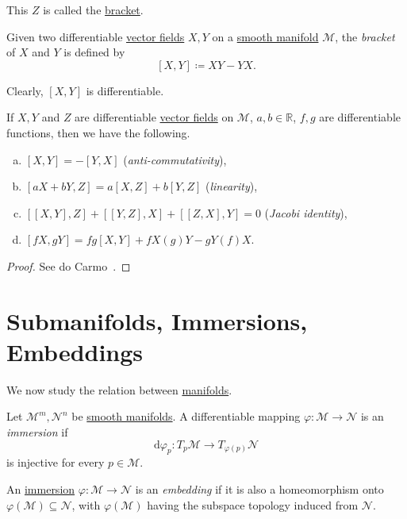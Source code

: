 This \(Z\) is called the \hyperref[def:bracket]{bracket}.

\begin{definition}[Bracket]\label{def:bracket}
	Given two differentiable \hyperref[def:vector-field]{vector fields} \(X, Y\) on a \hyperref[def:smooth-manifold]{smooth manifold} \(\mathcal{M} \), the \emph{bracket} of \(X\) and \(Y\) is defined by
	\[
		[X, Y] \coloneqq XY - YX.
	\]
\end{definition}

Clearly, \([X, Y]\) is differentiable.

\begin{proposition}
	If \(X, Y\) and \(Z\) are differentiable \hyperref[def:vector-field]{vector fields} on \(\mathcal{M} \), \(a, b\in \mathbb{R} \), \(f, g\) are differentiable functions, then we have the following.
	\begin{enumerate}[(a)]
		\item \([X, Y] = -[Y, X]\) (\emph{anti-commutativity}),
		\item \([aX + bY, Z] = a[X, Z] + b[Y, Z]\) (\emph{linearity}),
		\item \([[X, Y], Z] + [[Y, Z], X] + [[Z, X], Y] = 0\) (\emph{Jacobi identity}),
		\item \([fX, gY] = fg[X, Y] + fX(g)Y - gY(f)X\).
	\end{enumerate}
\end{proposition}
\begin{proof}
	See do Carmo~\cite[Chapter 0, Proposition 5.3]{flaherty2013riemannian}.
\end{proof}


\section{Submanifolds, Immersions, Embeddings}
We now study the relation between \hyperref[def:smooth-manifold]{manifolds}.

\begin{definition}[Immersion]\label{def:immersion}
	Let \(\mathcal{M} ^m , \mathcal{N} ^n \) be \hyperref[def:smooth-manifold]{smooth manifolds}. A differentiable mapping \(\varphi \colon \mathcal{M} \to  \mathcal{N} \) is an \emph{immersion} if
	\[
		\mathrm{d} \varphi _p \colon T_p \mathcal{M} \to  T_{\varphi (p)} \mathcal{N}
	\]
	is injective for every \(p\in \mathcal{M} \).
\end{definition}

\begin{definition}[Embedding]\label{def:embedding}
	An \hyperref[def:immersion]{immersion} \(\varphi \colon \mathcal{M} \to \mathcal{N} \) is an \emph{embedding} if it is also a homeomorphism onto \(\varphi (\mathcal{M} )\subseteq \mathcal{N} \), with \(\varphi (\mathcal{M} )\) having the subspace topology induced from \(\mathcal{N} \).
\end{definition}

